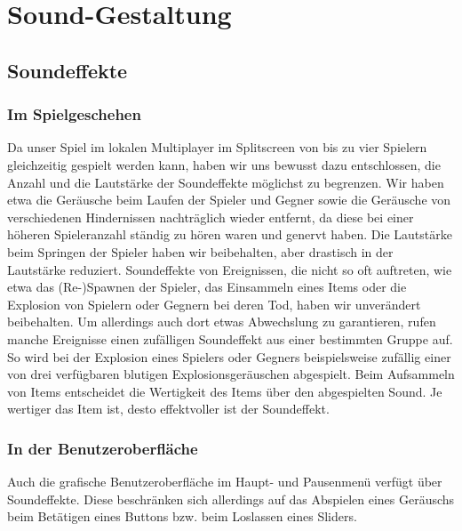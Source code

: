 
\section{Sound-Gestaltung}

\subsection{Soundeffekte}

\subsubsection*{Im Spielgeschehen}
Da unser Spiel im lokalen Multiplayer im Splitscreen von bis zu vier Spielern gleichzeitig gespielt werden kann, haben wir uns bewusst dazu entschlossen, die Anzahl und die Lautstärke der Soundeffekte möglichst zu begrenzen. Wir haben etwa die Geräusche beim Laufen der Spieler und Gegner sowie die Geräusche von verschiedenen Hindernissen nachträglich wieder entfernt, da diese bei einer höheren Spieleranzahl ständig zu hören waren und genervt haben. Die Lautstärke beim Springen der Spieler haben wir beibehalten, aber drastisch in der Lautstärke reduziert. Soundeffekte von Ereignissen, die nicht so oft auftreten, wie etwa das (Re-)Spawnen der Spieler, das Einsammeln eines Items oder die Explosion von Spielern oder Gegnern bei deren Tod, haben wir unverändert beibehalten. Um allerdings auch dort etwas Abwechslung zu garantieren, rufen manche Ereignisse einen zufälligen Soundeffekt aus einer bestimmten Gruppe auf. So wird bei der Explosion eines Spielers oder Gegners beispielsweise zufällig einer von drei verfügbaren blutigen Explosionsgeräuschen abgespielt. Beim Aufsammeln von Items entscheidet die Wertigkeit des Items über den abgespielten Sound. Je wertiger das Item ist, desto effektvoller ist der Soundeffekt.

\subsubsection*{In der Benutzeroberfläche}
Auch die grafische Benutzeroberfläche im Haupt- und Pausenmenü verfügt über Soundeffekte. Diese beschränken sich allerdings auf das Abspielen eines Geräuschs beim Betätigen eines Buttons bzw. beim Loslassen eines Sliders.

